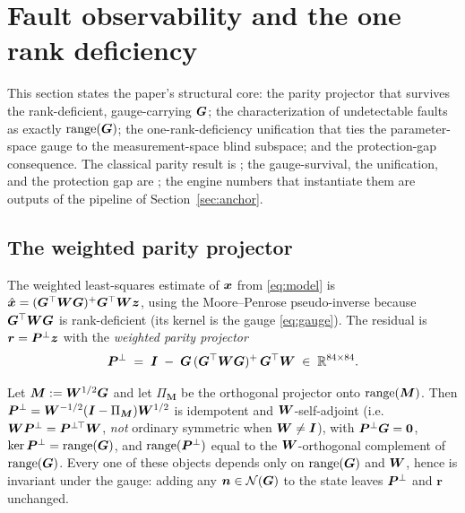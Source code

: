 \section{Fault observability and the one rank deficiency}
\label{sec:obs}

This section states the paper's structural core: the parity projector that survives the
rank-deficient, gauge-carrying $\bm{G}$; the characterization of undetectable faults as
exactly $\operatorname{range}(\bm{G})$; the one-rank-deficiency unification that ties the parameter-space
gauge to the measurement-space blind subspace; and the protection-gap consequence. The
classical parity result is \Cited{}; the gauge-survival, the unification, and the
protection gap are \Proven{}; the engine numbers that instantiate them are outputs of the
\Validated{} pipeline of Section~\ref{sec:anchor}.

\subsection{The weighted parity projector}
\label{sec:parity}

The weighted least-squares estimate of $\bm{x}$ from \eqref{eq:model} is
$\hat{\bm{x}}=(\bm{G}^\top\bm{W}\bm{G})^{+}\bm{G}^\top\bm{W}\bm z$, using the Moore--Penrose
pseudo-inverse because $\bm{G}^\top\bm{W}\bm{G}$ is rank-deficient (its kernel is the gauge
\eqref{eq:gauge}). The residual is $\bm r=\bm{P}^{\perp}\bm z$ with the \emph{weighted parity
projector}
\begin{equation}
  \bm{P}^{\perp} \;=\; \bm{I} \;-\; \bm{G}\,(\bm{G}^\top\bm{W}\bm{G})^{+}\,\bm{G}^\top\bm{W}
  \;\in\;\mathbb{R}^{84\times84}.
  \label{eq:pperp}
\end{equation}

\begin{proposition}
\label{prop:projector}
Let $\bm M:=\bm{W}^{1/2}\bm{G}$ and let $\Pi_{\bm M}$ be the orthogonal projector onto
$\operatorname{range}(\bm M)$. Then $\bm{P}^{\perp}=\bm{W}^{-1/2}(\bm{I}-\Pi_{\bm M})\bm{W}^{1/2}$ is idempotent and
$\bm{W}$-self-adjoint (i.e.\ $\bm{W}\bm{P}^{\perp}=\bm{P}^{\perp}{}^{\!\top}\bm{W}$, \emph{not} ordinary
symmetric when $\bm{W}\neq\bm{I}$), with $\bm{P}^{\perp}\bm{G}=\bm0$, $\ker\bm{P}^{\perp}=\operatorname{range}(\bm{G})$, and
$\operatorname{range}(\bm{P}^{\perp})$ equal to the $\bm{W}$-orthogonal complement of $\operatorname{range}(\bm{G})$. Every one of
these objects depends only on $\operatorname{range}(\bm{G})$ and $\bm{W}$, hence is invariant under the
gauge: adding any $\bm n\in\mathcal{N}(\bm{G})$ to the state leaves $\bm{P}^{\perp}$ and $\bm r$ unchanged.
\end{proposition}

